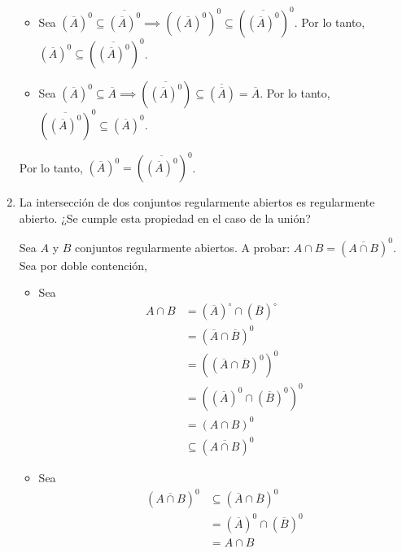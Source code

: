 \begin{problema}
\begin{enumerate}
\begin{dem}
\begin{itemize}
                \item Sea $(\overline{A})^0\subseteq \overline{(\overline{A})^0} \implies((\overline{A})^0)^0\subseteq (\overline{(\overline{A})^0})^0$. Por lo tanto, $(\overline{A})^0\subseteq (\overline{(\overline{A})^0})^0$. 
                \item Sea $\left(\overline{A}\right)^0\subseteq \overline{A}\implies (\overline{(\overline{A})^0})\subseteq \overline{\left(\overline{A}\right)}=\overline{A}$. Por lo tanto, $(\overline{(\overline{A})^0})^0 \subseteq (\overline{A})^0$.
            \end{itemize}
            Por lo tanto, $(\overline{A})^0=(\overline{(\overline{A})^0})^0$.
        \end{dem}
        \item La intersección de dos conjuntos regularmente abiertos es regularmente abierto. ¿Se cumple esta propiedad en el caso de la unión?
        \begin{dem}
            Sea $A$ y $B$ conjuntos regularmente abiertos. A probar: $A\cap B=\left(\overline{A\cap B}\right)^0$. Sea por doble contención, 
            \begin{itemize}
                \item Sea
                \begin{align*}
                    A\cap B &= (\overline{A})^\circ\cap (\overline{B})^\circ\\
                            &= (\overline{A}\cap \overline{B})^0\\
                            &= \left((\overline{A}\cap \overline{B})^0\right)^0\\
                            &= \left((\overline{A})^0\cap (\overline{B})^0\right)^0\\
                            &= \left(A\cap B\right)^0\\
                            &\subseteq \left(\overline{A\cap B}\right)^0
                \end{align*}
                \item Sea
                \begin{align*}
                    \left(\overline{A\cap B}\right)^0 &\subseteq \left(\overline{A}\cap\overline{B}\right)^0\\
                    &= (\overline{A})^0\cap (\overline{B})^0\\
                    &= A\cap B
                \end{align*}
            \end{itemize}

\end{dem}
\end{enumerate}
\end{problema}
